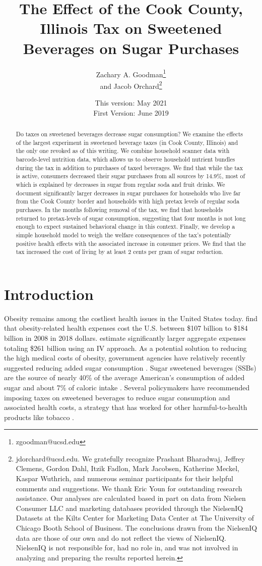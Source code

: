 \documentclass[12pt]{article}
\title{The Effect of the Cook County, Illinois Tax on Sweetened Beverages on Sugar Purchases}
\author{Zachary A. Goodman\thanks{zgoodman@ucsd.edu}\\ and Jacob Orchard\thanks{jdorchard@ucsd.edu. We gratefully recognize Prashant Bharadwaj, Jeffrey Clemens, Gordon Dahl, Itzik Fadlon, Mark Jacobsen, Katherine Meckel, Kaspar Wuthrich, and numerous seminar participants for their helpful comments and suggestions. We thank Eric Youn for outstanding research assistance. Our analyses are calculated based in part on data from Nielsen Consumer LLC and marketing databases provided through the NielsenIQ Datasets at the Kilts Center for Marketing Data Center at The University of Chicago Booth School of Business. The conclusions drawn from the NielsenIQ data are those of our own and do not reflect the views of NielsenIQ. NielsenIQ is not responsible for, had no role in, and was not involved in analyzing and preparing the results reported herein.}}
\affil{University of California, San Diego}
\date{This version: May 2021\\
First Version: June 2019}
\begin{document}
\maketitle

\begin{abstract}

Do taxes on sweetened beverages decrease sugar consumption? We examine the effects of the largest experiment in sweetened beverage taxes (in Cook County, Illinois) and the only one revoked as of this writing. We combine household scanner data with barcode-level nutrition data, which allows us to observe household nutrient bundles during the tax in addition to purchases of taxed beverages. We find that while the tax is active, consumers decreased their sugar purchases from all sources by 14.9\%, most of which is explained by decreases in sugar from regular soda and fruit drinks. We document significantly larger decreases in sugar purchases for households who live far from the Cook County border and households with high pretax levels of regular soda purchases. In the months following removal of the tax, we find that households returned to pretax-levels of sugar consumption, suggesting that four months is not long enough to expect sustained behavioral change in this context. Finally, we develop a simple household model to weigh the welfare consequences of the tax's potentially positive health effects with the associated increase in consumer prices. We find that the tax increased the cost of living by at least 2 cents per gram of sugar reduction.
\end{abstract}

\pagebreak

\doublespacing

\section{Introduction} \label{introduction}

Obesity remains among the costliest health issues in the United States today. \textcite{finkelstein2009annual} find that obesity-related health expenses cost the U.S. between \$107 billion to \$184 billion in 2008 in 2018 dollars. \textcite{cawley2012medical} estimate significantly larger aggregate expenses totaling \$261 billion using an IV approach. As a potential solution to reducing the high medical costs of obesity, government agencies have relatively recently suggested reducing added sugar consumption \parencite{dietary2015dietary}. Sugar sweetened beverages (SSBs) are the source of nearly 40\% of the average American's consumption of added sugar \parencite{dietary2015dietary} and about 7\% of caloric intake \parencite{allcott2019should}. Several policymakers have recommended imposing taxes on sweetened beverages to reduce sugar consumption and associated health costs, a strategy that has worked for other harmful-to-health products like tobacco \parencite{chaloupka2012tobacco}.
\end{document}

